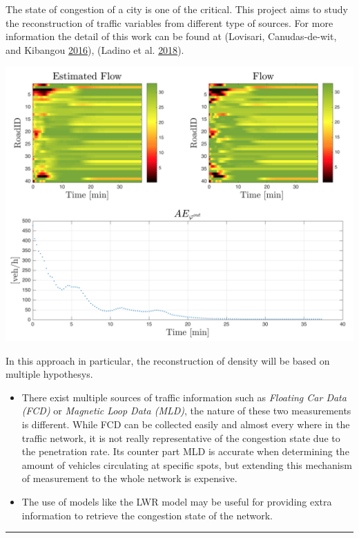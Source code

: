 \documentclass[]{book}
\providecommand{\tightlist}{%
  \setlength{\itemsep}{0pt}\setlength{\parskip}{0pt}}
\theoremstyle{definition}
\theoremstyle{definition}
\theoremstyle{definition}
\theoremstyle{remark}
\begin{document}
The state of congestion of a city is one of the critical. This project
aims to study the reconstruction of traffic variables from different
type of sources. For more information the detail of this work can be
found at (Lovisari, Canudas-de-wit, and Kibangou
\protect\hyperlink{ref-Lovisari2016}{2016}), (Ladino et al.
\protect\hyperlink{ref-Ladino2018}{2018}).

\includegraphics{images/p4-01-density.png}

In this approach in particular, the reconstruction of density will be
based on multiple hypothesys.

\begin{itemize}
\tightlist
\item
  There exist multiple sources of traffic information such as
  \emph{Floating Car Data (FCD)} or \emph{Magnetic Loop Data (MLD)}, the
  nature of these two measurements is different. While FCD can be
  collected easily and almost every where in the traffic network, it is
  not really representative of the congestion state due to the
  penetration rate. Its counter part MLD is accurate when determining
  the amount of vehicles circulating at specific spots, but extending
  this mechanism of measurement to the whole network is expensive.
\item
  The use of models like the LWR model may be useful for providing extra
  information to retrieve the congestion state of the network.
\end{itemize}

\begin{center}\rule{0.5\linewidth}{\linethickness}\end{center}
\end{document}
